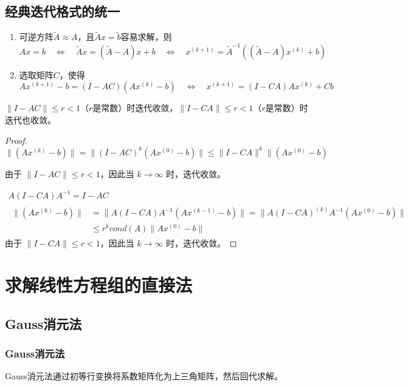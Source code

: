\subsection{经典迭代格式的统一}
\begin{enumerate}
    \item 可逆方阵\(\tilde{A}\approx A\text{，且}\tilde{A}x=\tilde{b}\text{容易求解，则}\)
    \[Ax = b \quad\Leftrightarrow \quad \tilde{A}x=(\tilde{A}-A)x+b \quad\Leftrightarrow\quad 
    x^{(k+1)}=\tilde{A}^{-1}\left((\tilde{A}-A)x^{(k)}+b\right)\]
    \item 选取矩阵\(C\)，使得\[
    Ax^{(k+1)}-b=(I-AC)(Ax^{(k)}-b)\quad\Leftrightarrow\quad x^{(k+1)}=(I-CA)Ax^{(k)}+Cb\]
\end{enumerate}

\begin{theorem}
    \(\|I-AC\|\le r<1\)（\(r\)是常数）时迭代收敛，\(\|I-CA\|\le r<1\)（\(r\)是常数）时迭代也收敛。
    \begin{proof}
\[
\|(Ax^{(k)}-b)\| = \|(I-AC)^k (Ax^{(0)}-b)\| \leq \|I-CA\|^k \|(Ax^{(0)}-b)
\]

由于 $\|I-AC\|\le r<1$，因此当 $k \to \infty$ 时，迭代收敛。

\begin{gather*}
    A(I-CA)A^{-1}=I-AC\\
    \begin{aligned}
        \|(Ax^{(k)}-b)\| &= \|A(I-CA)A^{-1}(Ax^{(k-1)}-b)\|=\|A(I-CA)^{(k)}A^{-1}(Ax^{(0)}-b)\|\\
        &\le r^k cond(A)  \|Ax^{(0)}-b\|
    \end{aligned}
\end{gather*}
由于 $\|I-CA\|\le r<1$，因此当 $k \to \infty$ 时，迭代收敛。
    \end{proof}
\end{theorem}

\section{求解线性方程组的直接法}
\subsection{Gauss消元法}
\subsubsection{Gauss消元法}
Gauss消元法通过初等行变换将系数矩阵化为上三角矩阵，然后回代求解。

